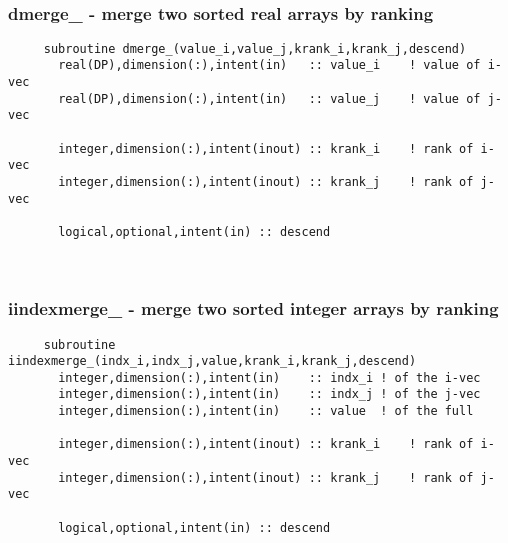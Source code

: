 \mbox{}\hrulefill\ 
 
  \subsubsection{dmerge\_ - merge two sorted real arrays by ranking}

\begin{verbatim} 
     subroutine dmerge_(value_i,value_j,krank_i,krank_j,descend)
       real(DP),dimension(:),intent(in)   :: value_i	! value of i-vec
       real(DP),dimension(:),intent(in)   :: value_j	! value of j-vec
 
       integer,dimension(:),intent(inout) :: krank_i	! rank of i-vec
       integer,dimension(:),intent(inout) :: krank_j	! rank of j-vec
 
       logical,optional,intent(in) :: descend
 \end{verbatim}%
 
 
\mbox{}\hrulefill\ 
 
  \subsubsection{iindexmerge\_ - merge two sorted integer arrays by ranking}

\begin{verbatim} 
     subroutine iindexmerge_(indx_i,indx_j,value,krank_i,krank_j,descend)
       integer,dimension(:),intent(in)    :: indx_i	! of the i-vec
       integer,dimension(:),intent(in)    :: indx_j	! of the j-vec
       integer,dimension(:),intent(in)    :: value	! of the full
 
       integer,dimension(:),intent(inout) :: krank_i	! rank of i-vec
       integer,dimension(:),intent(inout) :: krank_j	! rank of j-vec
 
       logical,optional,intent(in) :: descend
 \end{verbatim}%
 
 
